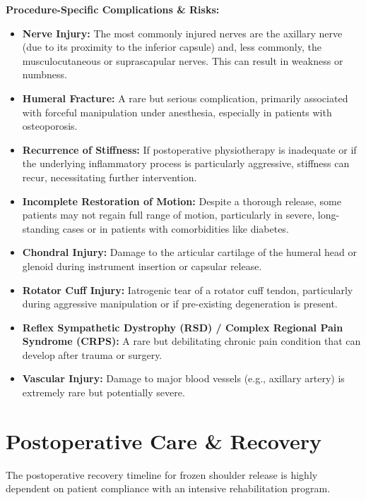 \textbf{Procedure-Specific Complications \& Risks:}
\begin{itemize}
  \item \textbf{Nerve Injury:} The most commonly injured nerves are the axillary nerve (due to its proximity to the inferior capsule) and, less commonly, the musculocutaneous or suprascapular nerves. This can result in weakness or numbness.
  
  \item \textbf{Humeral Fracture:} A rare but serious complication, primarily associated with forceful manipulation under anesthesia, especially in patients with osteoporosis.
  
  \item \textbf{Recurrence of Stiffness:} If postoperative physiotherapy is inadequate or if the underlying inflammatory process is particularly aggressive, stiffness can recur, necessitating further intervention.
  
  \item \textbf{Incomplete Restoration of Motion:} Despite a thorough release, some patients may not regain full range of motion, particularly in severe, long-standing cases or in patients with comorbidities like diabetes.
  
  \item \textbf{Chondral Injury:} Damage to the articular cartilage of the humeral head or glenoid during instrument insertion or capsular release.
  
  \item \textbf{Rotator Cuff Injury:} Iatrogenic tear of a rotator cuff tendon, particularly during aggressive manipulation or if pre-existing degeneration is present.
  
  \item \textbf{Reflex Sympathetic Dystrophy (RSD) / Complex Regional Pain Syndrome (CRPS):} A rare but debilitating chronic pain condition that can develop after trauma or surgery.
  
  \item \textbf{Vascular Injury:} Damage to major blood vessels (e.g., axillary artery) is extremely rare but potentially severe.
\end{itemize}

\section*{Postoperative Care \& Recovery}
The postoperative recovery timeline for frozen shoulder release is highly dependent on patient compliance with an intensive rehabilitation program.

